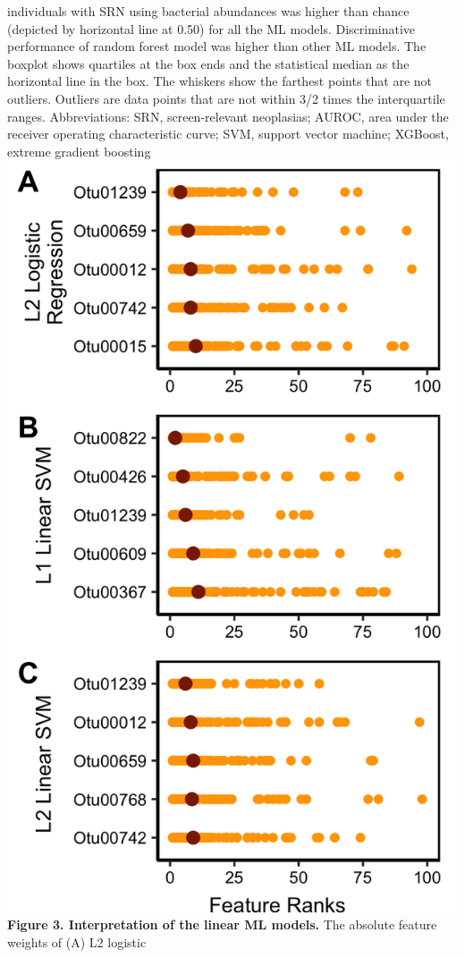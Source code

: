 \documentclass[11pt,]{article}
\begin{document}
individuals with SRN using bacterial abundances was higher than chance
(depicted by horizontal line at 0.50) for all the ML models.
Discriminative performance of random forest model was higher than other
ML models. The boxplot shows quartiles at the box ends and the
statistical median as the horizontal line in the box. The whiskers show
the farthest points that are not outliers. Outliers are data points that
are not within 3/2 times the interquartile ranges. Abbreviations: SRN,
screen-relevant neoplasias; AUROC, area under the receiver operating
characteristic curve; SVM, support vector machine; XGBoost, extreme
gradient boosting \newpage
\includegraphics{Figure_3.png} \textbf{Figure 3. Interpretation of the
linear ML models.} The absolute feature weights of (A) L2 logistic
\end{document}
